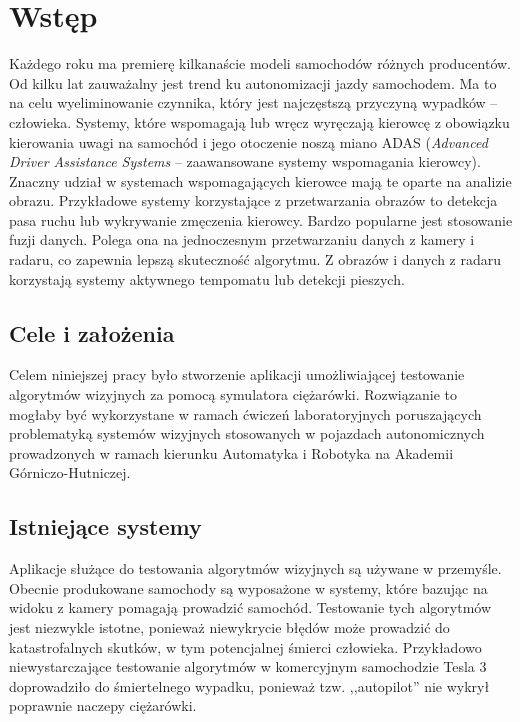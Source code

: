 \chapter{Wstęp}


Każdego roku ma premierę kilkanaście modeli samochodów różnych producentów. %
Od kilku lat zauważalny jest trend ku autonomizacji jazdy samochodem.  
Ma to na celu wyeliminowanie czynnika, który jest najczęstszą przyczyną wypadków -- człowieka. %
Systemy, które wspomagają lub wręcz wyręczają kierowcę z obowiązku kierowania uwagi na samochód i jego otoczenie noszą miano ADAS (\textit{Advanced Driver Assistance Systems} -- zaawansowane systemy wspomagania kierowcy). 
Znaczny udział w systemach wspomagających kierowce mają te oparte na analizie obrazu. %
Przykładowe systemy korzystające z przetwarzania obrazów to detekcja pasa ruchu lub wykrywanie zmęczenia kierowcy. 
Bardzo popularne jest stosowanie fuzji danych. 
Polega ona na jednoczesnym przetwarzaniu danych z kamery i radaru, co zapewnia lepszą skuteczność algorytmu. %
Z obrazów i danych z radaru korzystają systemy aktywnego tempomatu lub detekcji pieszych.


\section{Cele i założenia}

Celem niniejszej pracy było stworzenie aplikacji umożliwiającej testowanie algorytmów wizyjnych za pomocą symulatora ciężarówki.
Rozwiązanie to mogłaby być wykorzystane w ramach ćwiczeń laboratoryjnych poruszających problematyką systemów wizyjnych stosowanych w pojazdach autonomicznych prowadzonych w ramach kierunku Automatyka i Robotyka na Akademii Górniczo-Hutniczej.

\section{Istniejące systemy}
Aplikacje służące do testowania algorytmów wizyjnych są używane w przemyśle. 
Obecnie produkowane samochody są wyposażone w systemy, które bazując na widoku z kamery pomagają prowadzić samochód. 
Testowanie tych algorytmów jest niezwykle istotne, ponieważ niewykrycie błędów może prowadzić do katastrofalnych skutków, w tym potencjalnej śmierci człowieka. 
Przykładowo niewystarczające testowanie algorytmów w komercyjnym samochodzie Tesla 3 doprowadziło do śmiertelnego wypadku, ponieważ tzw. ,,autopilot'' nie wykrył poprawnie naczepy ciężarówki.

